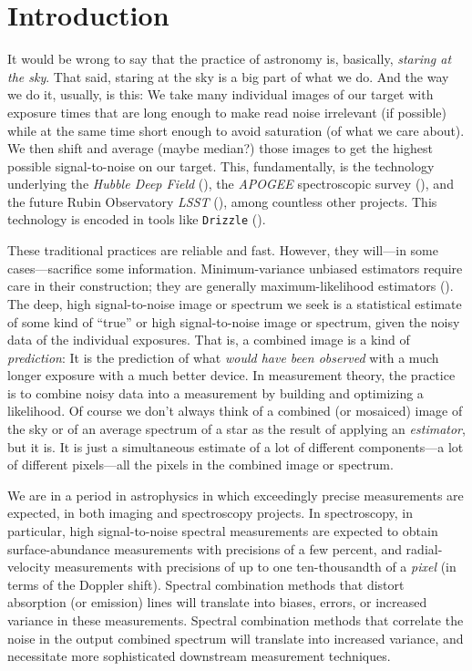 \documentclass[modern, linenumbers]{aastex631}
\begin{document}

\section{Introduction}\label{sec:intro}

It would be wrong to say that the practice of astronomy is, basically, \emph{staring at the sky}.
That said, staring at the sky is a big part of what we do.
And the way we do it, usually, is this:
We take many individual images of our target with exposure times that are long enough to make read noise irrelevant (if possible) while at the same time short enough to avoid saturation (of what we care about).
We then shift and average (maybe median?) those images to get the highest possible signal-to-noise on our target.
This, fundamentally, is the technology underlying the \textsl{Hubble Deep Field} (\citealt{hdf}),
the \textsl{APOGEE} spectroscopic survey (\citealt{apogee}),
and the future Rubin Observatory \textsl{LSST} (\citealt{lsst}), among countless other projects.
This technology is encoded in tools like \texttt{Drizzle} (\citealt{drizzle}).

These traditional practices are reliable and fast.
However, they will---in some cases---sacrifice some information.
Minimum-variance unbiased estimators require care in their construction; they are generally maximum-likelihood estimators (\citealt{mvue}).
The deep, high signal-to-noise image or spectrum we seek is a statistical estimate of some kind of ``true'' or high signal-to-noise image or spectrum, given the noisy data of the individual exposures.
That is, a combined image is a kind of \emph{prediction}: It is the prediction of what \emph{would have been observed} with a much longer exposure with a much better device.
In measurement theory, the practice is to combine noisy data into a measurement by building and optimizing a likelihood.
Of course we don't always think of a combined (or mosaiced) image of the sky or of an average spectrum of a star as the result of applying an \emph{estimator}, but it is.
It is just a simultaneous estimate of a lot of different components---a lot of different pixels---all the pixels in the combined image or spectrum.

We are in a period in astrophysics in which exceedingly precise measurements are expected, in both imaging and spectroscopy projects.
In spectroscopy, in particular, high signal-to-noise spectral measurements are expected to obtain surface-abundance measurements with precisions of a few percent, and radial-velocity measurements with precisions of up to one ten-thousandth of a \emph{pixel} (in terms of the Doppler shift).
Spectral combination methods that distort absorption (or emission) lines will translate into biases, errors, or increased variance in these measurements.
Spectral combination methods that correlate the noise in the output combined spectrum will translate into increased variance, and necessitate more sophisticated downstream measurement techniques.
\end{document}
